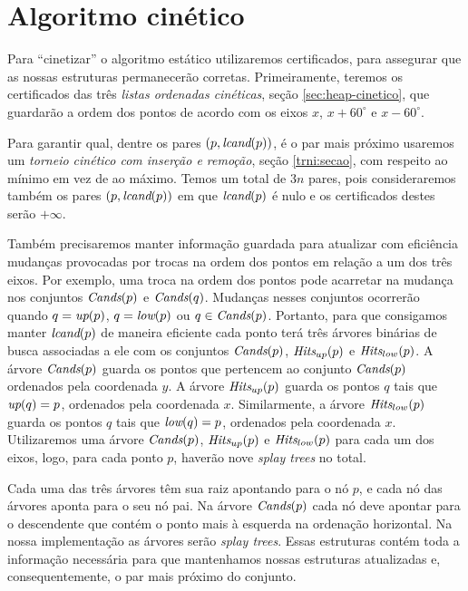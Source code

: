
\FloatBarrier


\section{Algoritmo cinético}

Para ``cinetizar'' o algoritmo estático utilizaremos certificados,
para assegurar que as nossas estruturas permanecerão corretas.
Primeiramente, teremos os certificados das três \textit{listas
ordenadas cinéticas}, seção \ref{sec:heap-cinetico}, que guardarão a ordem
dos pontos de acordo com os eixos $x$, $x + 60^\circ$ e $x -
60^\circ$.

Para garantir qual, dentre os pares $(p, \textit{lcand}(p))$, é o par mais
próximo usaremos um \textit{torneio cinético com inserção e
remoção}, seção \ref{trni:secao}, com respeito ao mínimo em vez de
ao máximo. Temos um total de $3n$ pares, pois consideraremos também
os pares $(p, \textit{lcand}(p))$ em que $\textit{lcand}(p)$ é nulo e os
certificados destes serão $+\infty$.

Também precisaremos manter informação guardada para atualizar com
eficiência mudanças provocadas por trocas na ordem dos pontos em
relação a um dos três eixos. Por exemplo, uma troca na ordem dos
pontos pode acarretar na mudança nos conjuntos $\textit{Cands}(p)$ e
$\textit{Cands}(q)$. Mudanças nesses conjuntos ocorrerão quando $q =
\textit{up}(p)$, $q = \textit{low}(p)$ ou $q \in \textit{Cands}(p)$. Portanto, para que
consigamos manter $\textit{lcand}(p)$ de maneira eficiente cada ponto terá
três árvores binárias de busca associadas a ele com os conjuntos
$\textit{Cands}(p)$, $\textit{Hits}_{up}(p)$ e $\textit{Hits}_{low}(p)$. A árvore
$\textit{Cands}(p)$ guarda os pontos que pertencem ao conjunto $\textit{Cands}(p)$
ordenados pela coordenada $y$. A árvore $\textit{Hits}_{up}(p)$ guarda os
pontos $q$ tais que $\textit{up}(q) = p$, ordenados pela coordenada $x$.
Similarmente, a árvore $\textit{Hits}_{low}(p)$ guarda os pontos $q$ tais
que $\textit{low}(q) = p$, ordenados pela coordenada $x$. Utilizaremos uma
árvore $\textit{Cands}(p)$, $\textit{Hits}_{up}(p)$ e $\textit{Hits}_{low}(p)$ para cada um
dos eixos, logo, para cada ponto $p$, haverão nove \textit{splay
trees} no total.

Cada uma das três árvores têm sua raiz apontando para o nó $p$, e
cada nó das árvores aponta para o seu nó pai. Na árvore $\textit{Cands}(p)$
cada nó deve apontar para o descendente que contém o ponto mais à
esquerda na ordenação horizontal. Na nossa implementação as árvores
serão \textit{splay trees}. Essas estruturas contém toda a
informação necessária para que mantenhamos nossas estruturas
atualizadas e, consequentemente, o par mais próximo do conjunto.

